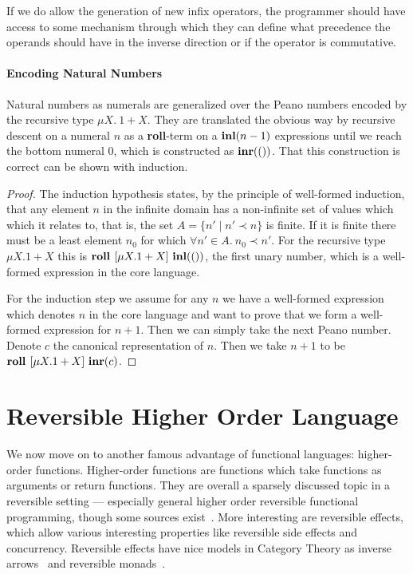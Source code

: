 If we do allow the generation of new infix operators, the programmer should
have access to some mechanism through which they can define what precedence the
operands should have in the inverse direction or if the operator is
commutative.

\paragraph{Encoding Natural Numbers}

Natural numbers as numerals are generalized over the Peano numbers encoded by
the recursive type $\mu X .~1 + X$. They are translated the obvious way by
recursive descent on a numeral $n$ as a \textbf{roll}-term on a $\textbf{inl}(n - 1)$
expressions until we reach the bottom numeral $0$, which is constructed as
$\textbf{inr}(())$. That this construction is correct can be shown with induction.

\begin{proof}

  The induction hypothesis states, by the principle of well-formed induction,
  that any element $n$ in the infinite domain has a non-infinite set of values
  which which it relates to, that is, the set $A = \{ n' \mid n' \prec n \}$ is
  finite. If it is finite there must be a least element $n_0$ for which
  $\forall n' \in A.\ n_0 \prec n'$. For the recursive type $\mu X . 1 + X$
  this is $\textbf{roll } [\mu X . 1 + X]\ \textbf{inl}(())$, the first unary number, which is a
  well-formed expression in the core language.

  For the induction step we assume for any $n$ we have a well-formed expression
  which denotes $n$ in the core language and want to prove that we form a
  well-formed expression for $n + 1$. Then we can simply take the next Peano
  number. Denote $c$ the canonical representation of $n$. Then we take $n + 1$
  to be $\textbf{roll } [\mu X . 1 + X]\ \textbf{inr}(c)$.

\end{proof}

\section{Reversible Higher Order Language}\label{sect:higher_order}

We now move on to another famous advantage of functional languages:
higher-order functions. Higher-order functions are functions which take
functions as arguments or return functions. They are overall a sparsely
discussed topic in a reversible setting --- especially general higher order
reversible functional programming, though some sources exist~\cite{Bohne}.
More interesting are reversible effects, which allow various interesting
properties like reversible side effects and concurrency. Reversible effects
have nice models in Category Theory as inverse arrows~\cite{Heunen:2018} and
reversible monads~\cite{Heunen:2015}.

